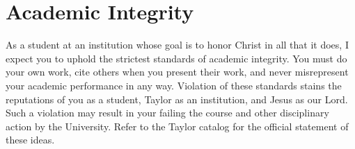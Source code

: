 \documentclass{article}
\begin{document}
\section{Academic Integrity}
\label{sec:orgheadline17}
As a student at an institution whose goal is to honor Christ in all that it does,
I expect you to uphold the strictest standards of academic integrity.
You must do your own work, cite others when you present their work,
and never misrepresent your academic performance in any way.
Violation of these standards stains the reputations of you as a student,
Taylor as an institution,
and Jesus as our Lord.
Such a violation may result in your failing the course
and other disciplinary action by the University.
Refer to the Taylor catalog for the official statement of these ideas.
\end{document}
